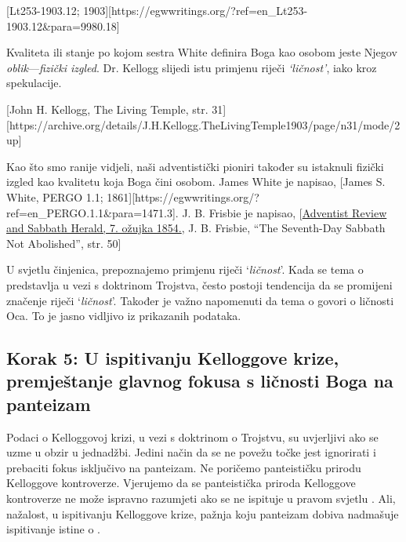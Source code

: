 [Lt253-1903.12; 1903][https://egwwritings.org/?ref=en\_Lt253-1903.12&para=9980.18]

Kvaliteta ili stanje po kojom sestra White definira Boga kao osobom jeste Njegov \textit{oblik}—\textit{fizički izgled}. Dr. Kellogg slijedi istu primjenu riječi \textit{‘ličnost’}, iako kroz spekulacije.

[John H. Kellogg, The Living Temple, str. 31][https://archive.org/details/J.H.Kellogg.TheLivingTemple1903/page/n31/mode/2up]

Kao što smo ranije vidjeli, naši adventistički pioniri također su istaknuli fizički izgled kao kvalitetu koja Boga čini osobom. James White je napisao, [James S. White, PERGO 1.1; 1861][https://egwwritings.org/?ref=en\_PERGO.1.1&para=1471.3]. J. B. Frisbie je napisao, [\href{https://documents.adventistarchives.org/Periodicals/RH/RH18540307-V05-07.pdf}{Adventist Review and Sabbath Herald, 7. ožujka 1854.}, J. B. Frisbie, “The Seventh-Day Sabbath Not Abolished”, str. 50]

U svjetlu činjenica, prepoznajemo primjenu riječi ‘\textit{ličnost}’. Kada se tema o  predstavlja u vezi s doktrinom Trojstva, često postoji tendencija da se promijeni značenje riječi ‘\textit{ličnost}’. Također je važno napomenuti da tema o  govori o ličnosti Oca. To je jasno vidljivo iz prikazanih podataka.

\subsection*{Korak 5: U ispitivanju Kelloggove krize, premještanje glavnog fokusa s ličnosti Boga na panteizam}

Podaci o Kelloggovoj krizi, u vezi s doktrinom o Trojstvu, su uvjerljivi ako se  uzme u obzir u jednadžbi. Jedini način da se ne povežu točke jest ignorirati  i prebaciti fokus isključivo na panteizam. Ne poričemo panteističku prirodu Kelloggove kontroverze. Vjerujemo da se panteistička priroda Kelloggove kontroverze ne može ispravno razumjeti ako se ne ispituje u pravom svjetlu . Ali, nažalost, u ispitivanju Kelloggove krize, pažnja koju panteizam dobiva nadmašuje ispitivanje istine o .

